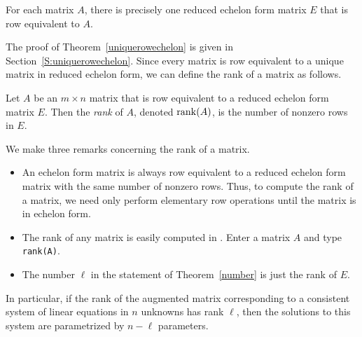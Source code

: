 \documentclass{ximera}
\begin{document}
\begin{theorem} \label{uniquerowechelon}
For each matrix $A$, there is precisely one reduced echelon form
matrix $E$ that is row equivalent  to $A$.
\end{theorem}

The proof of Theorem~\ref{uniquerowechelon} is given in 
Section~\ref{S:uniquerowechelon}.  Since every matrix is row equivalent 
to a unique matrix in reduced echelon form, we can define the rank 
of a matrix as follows.
\begin{definition}  \label{D:rank}
Let $A$ be an $m\times n$ matrix that is row equivalent to a
reduced echelon form matrix $E$.  Then the {\em rank\/} of $A$,
denoted ${\rm rank}(A)$, is the number of nonzero rows in $E$.
\end{definition}  

We make three remarks concerning the rank of a matrix.
\begin{itemize}
\item An echelon form matrix is always row equivalent to a
reduced echelon form matrix with the same number of nonzero
rows.  Thus, to compute the rank of a matrix, we need only
perform elementary row operations until the matrix is in echelon
form.
\item	The rank of any matrix is easily computed in \Matlabp.
Enter a matrix $A$ and type {\tt rank(A)}.
\item The number $\ell$ in the statement of Theorem~\ref{number}
is just the rank of $E$.
\end{itemize}
In particular, if the rank of the augmented matrix corresponding to
a consistent system of linear equations in $n$ unknowns has rank $\ell$,
then the solutions to this system are parametrized by $n-\ell$ parameters.


\EXER

\end{document}
